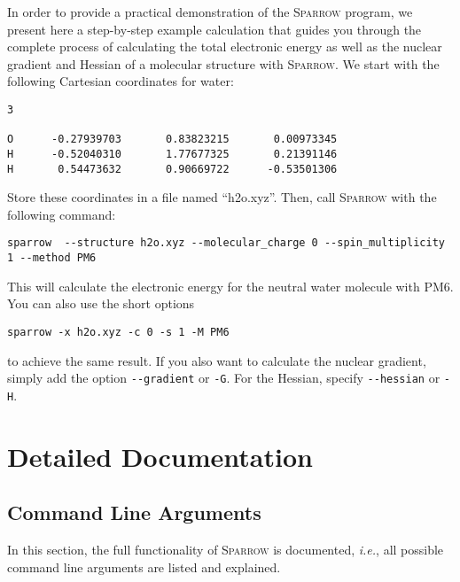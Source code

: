 \documentclass[]{tufte-book}
\begin{document}
In order to provide a practical demonstration of the \textsc{Sparrow} program, we present here a step-by-step example calculation that guides 
you through the complete process of calculating the total electronic energy as well as the nuclear gradient and Hessian of a molecular structure 
with \textsc{Sparrow}. We start with the following
Cartesian coordinates for water:
\begin{verbatim}
3

O      -0.27939703       0.83823215       0.00973345
H      -0.52040310       1.77677325       0.21391146
H       0.54473632       0.90669722      -0.53501306
\end{verbatim}
Store these coordinates in a file named ``h2o.xyz''. Then, call \textsc{Sparrow} with the following command:
\begin{verbatim}
sparrow  --structure h2o.xyz --molecular_charge 0 --spin_multiplicity 1 --method PM6
\end{verbatim}
This will calculate the electronic energy for the neutral water molecule with PM6. You can also use the short options
\begin{verbatim}
sparrow -x h2o.xyz -c 0 -s 1 -M PM6
\end{verbatim}
to achieve the same result. If you also want to calculate the nuclear gradient, simply add the option \texttt{-{}-gradient}
or \texttt{-G}. For the Hessian, specify \texttt{-{}-hessian} or \texttt{-H}.



\chapter{Detailed Documentation}

\section{Command Line Arguments}

In this section, the full functionality of \textsc{Sparrow} is documented, \textit{i.e.}, all possible command line arguments
are listed and explained.
\end{document}
